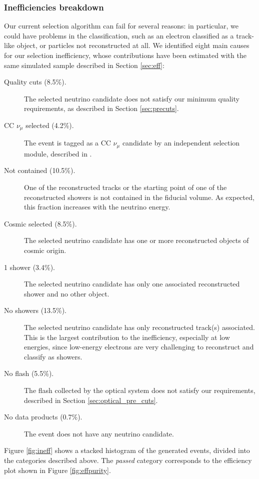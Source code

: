 \subsubsection{Inefficiencies breakdown}\label{sec:ineff}
Our current selection algorithm can fail for several reasons: in particular, we could have problems in the classification, such as an electron classified as a track-like object, or particles not reconstructed at all. We identified eight main causes for our selection inefficiency, whose contributions have been estimated with the same simulated sample described in Section \ref{sec:eff}:
\begin{description}

\item[Quality cuts (8.5\%).] {The selected neutrino candidate does not satisfy our minimum quality requirements, as described in Section \ref{sec:precuts}.}
\item[CC $\nu_{\mu}$ selected (4.2\%).]  {The event is tagged as a CC $\nu_{\mu}$ candidate by an independent selection module, described in \cite{ubxsec}}. 
\item[Not contained (10.5\%).] {One of the reconstructed tracks or the starting point of one of the reconstructed showers is not contained in the fiducial volume. As expected, this fraction increases with the neutrino energy}.
\item[Cosmic selected (8.5\%).] {The selected neutrino candidate has one or more reconstructed objects of cosmic origin}.
\item[1 shower (3.4\%).] {The selected neutrino candidate has only one associated reconstructed shower and no other object}. 
\item[No showers (13.5\%).]  {The selected neutrino candidate has only reconstructed track(s) associated. This is the largest contribution to the inefficiency, especially at low energies, since low-energy electrons are very challenging to reconstruct and classify as showers.}
\item[No flash (5.5\%).]  {The flash collected by the optical system does not satisfy our requirements, described in Section \ref{sec:optical_pre_cuts}}.
\item[No data products (0.7\%).] {The event does not have any neutrino candidate}.
\end{description}

Figure \ref{fig:ineff} shows a stacked histogram of the generated events, divided into the categories described above. The \emph{passed} category corresponds to the efficiency plot shown in Figure \ref{fig:effpurity}.


